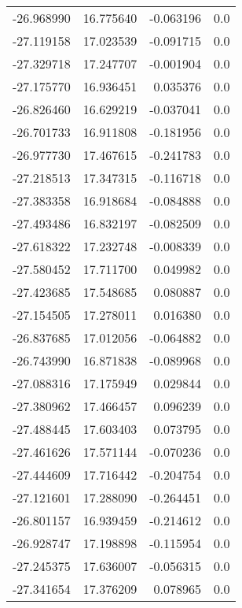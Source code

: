 \begin{tabular}{rrrr}
      -26.968990 &        16.775640 &   -0.063196 &   0.0 \\
      -27.119158 &        17.023539 &   -0.091715 &   0.0 \\
      -27.329718 &        17.247707 &   -0.001904 &   0.0 \\
      -27.175770 &        16.936451 &    0.035376 &   0.0 \\
      -26.826460 &        16.629219 &   -0.037041 &   0.0 \\
      -26.701733 &        16.911808 &   -0.181956 &   0.0 \\
      -26.977730 &        17.467615 &   -0.241783 &   0.0 \\
      -27.218513 &        17.347315 &   -0.116718 &   0.0 \\
      -27.383358 &        16.918684 &   -0.084888 &   0.0 \\
      -27.493486 &        16.832197 &   -0.082509 &   0.0 \\
      -27.618322 &        17.232748 &   -0.008339 &   0.0 \\
      -27.580452 &        17.711700 &    0.049982 &   0.0 \\
      -27.423685 &        17.548685 &    0.080887 &   0.0 \\
      -27.154505 &        17.278011 &    0.016380 &   0.0 \\
      -26.837685 &        17.012056 &   -0.064882 &   0.0 \\
      -26.743990 &        16.871838 &   -0.089968 &   0.0 \\
      -27.088316 &        17.175949 &    0.029844 &   0.0 \\
      -27.380962 &        17.466457 &    0.096239 &   0.0 \\
      -27.488445 &        17.603403 &    0.073795 &   0.0 \\
      -27.461626 &        17.571144 &   -0.070236 &   0.0 \\
      -27.444609 &        17.716442 &   -0.204754 &   0.0 \\
      -27.121601 &        17.288090 &   -0.264451 &   0.0 \\
      -26.801157 &        16.939459 &   -0.214612 &   0.0 \\
      -26.928747 &        17.198898 &   -0.115954 &   0.0 \\
      -27.245375 &        17.636007 &   -0.056315 &   0.0 \\
      -27.341654 &        17.376209 &    0.078965 &   0.0 \\

\end{tabular}
